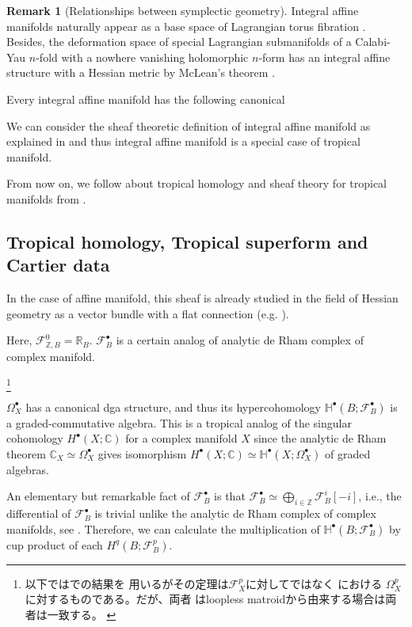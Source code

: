 \documentclass[a4paper,dvipdfmx,reqno,12pt]{amsart}
\theoremstyle{definition}
\newtheorem{Rmk}[Thm]{Remark}
\newcommand{\C}{\mathbb{C}}%
\newcommand{\R}{\mathbb{R}}%
\newcommand{\Z}{\mathbb{Z}}%
\newcommand{\mb}[1]{\mathbb{#1}}%
\newcommand{\mcal}[1]{\mathcal{#1}}%
\numberwithin{equation}{section}
\begin{document}
\begin{Rmk}[{Relationships between symplectic geometry}]
Integral affine manifolds naturally appear 
as a base space of Lagrangian torus fibration 
\cite{duistermaatGlobalActionangleCoordinates1980a}. 
Besides, the deformation space of 
special Lagrangian submanifolds of
a Calabi-Yau $n$-fold with a nowhere vanishing 
holomorphic $n$-form has 
an integral affine structure with 
a Hessian metric by McLean's theorem \cite{MR1664890}.

Every integral affine manifold has the following canonical
\end{Rmk}

We can consider the sheaf theoretic definition of 
integral affine manifold as explained 
in \cite[2.1]{kontsevichAffineStructuresNonArchimedean2006a} 
and thus integral affine manifold is a special case of 
tropical manifold.

From now on, we follow about tropical homology and sheaf 
theory for tropical manifolds
from \cite{MR3903579,gross2019sheaftheoretic}.

\subsection{Tropical homology, Tropical superform and Cartier data}

In the case of affine manifold, this sheaf is already
studied in the field of Hessian geometry as a vector bundle
with a flat connection
(e.g. \cite[Chapter 7]{MR2293045}).


Here, $\mcal{F}_{\Z, B}^{0}=\R_B$. 
$\mcal{F}_{B}^{\bullet}$ is a certain analog of analytic
de Rham complex of complex manifold.

\footnote{以下では\cite{gross2019sheaftheoretic}での結果を
用いるがその定理は$\mcal{F}_X^{p}$に対してではなく
\cite{gross2019sheaftheoretic}における
$\Omega_X^{p}$に対するものである。だが、両者
はloopless matroidから由来する場合は両者は一致する。
\cite[Remark 2.8]{gross2019sheaftheoretic}}

$\Omega_X^{\bullet}$ has a canonical dga structure, 
and thus its hypercohomology 
$\mb{H}^{\bullet}(B;\mcal{F}_{B}^{\bullet})$ is a 
graded-commutative algebra. 
This is a tropical analog of the singular cohomology
$H^{\bullet}(X;\C)$ for a complex manifold $X$ since 
the analytic de Rham theorem $\C_X \simeq \Omega_X^{\bullet}$ 
gives isomorphism 
$H^{\bullet}(X;\C)\simeq \mb{H}^{\bullet}(X;\Omega_X^{\bullet})$
of graded algebras. 

An elementary but remarkable fact of 
$\mcal{F}_{B}^{\bullet}$ is that $\mcal{F}_{B}^{\bullet}\simeq 
\bigoplus_{i\in \Z}\mcal{F}_B^{i}[-i]$, i.e., the differential 
of $\mcal{F}_{B}^{\bullet}$ is trivial unlike the analytic de Rham complex
of complex manifolds, see \cite[Corollary 2.15]{epub36262}.
Therefore, we can calculate the multiplication of 
$\mb{H}^{\bullet}(B;\mcal{F}_B^{\bullet})$ by 
cup product of each $H^{q}(B;\mcal{F}_B^{p})$.
\end{document}
